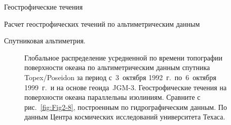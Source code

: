 \begin{chapter}{Геострофические течения}
\begin{section}{Расчет геострофических течений по альтиметрическим данным}
\begin{paragraph}{Спутниковая альтиметрия.}
\begin{figure}[t!]
\caption{Глобальное распределение усредненной по времени топографии поверхности океана
по альтиметрическим данным спутника Topex/Poseidon за период
с~3~октября 1992~г.\ по~6~октября 1999~г.\ и на основе 
геоида~JGM-3. Геострофические течения на поверхности 
океана параллельны
изолиниям. Сравните с рис.~\ref{fig:Fig2-8}, построенным по гидрографическим
данным. По данным Центра космических 
исследований университета Техаса.}
\label{fig:sshmean}
\vspace{-4ex}
\end{figure}
%


\end{paragraph}
\end{section}
\end{chapter}
